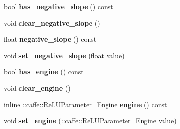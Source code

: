 \begin{DoxyCompactItemize}
\item 
\mbox{\label{classcaffe_1_1_re_l_u_parameter_aab97fa54fb5612aac71e783ff50fb45d}} 
bool {\bfseries has\+\_\+negative\+\_\+slope} () const
\item 
\mbox{\label{classcaffe_1_1_re_l_u_parameter_a61bcb0fe079237105af54eb543a0c786}} 
void {\bfseries clear\+\_\+negative\+\_\+slope} ()
\item 
\mbox{\label{classcaffe_1_1_re_l_u_parameter_a564297ba27a5412fbf069275ff2eec85}} 
float {\bfseries negative\+\_\+slope} () const
\item 
\mbox{\label{classcaffe_1_1_re_l_u_parameter_a45ad9a4d3dbee43fafa3c50b8b48d5bf}} 
void {\bfseries set\+\_\+negative\+\_\+slope} (float value)
\item 
\mbox{\label{classcaffe_1_1_re_l_u_parameter_aad85d4495f66ec22de53568db5a08214}} 
bool {\bfseries has\+\_\+engine} () const
\item 
\mbox{\label{classcaffe_1_1_re_l_u_parameter_a0bc017b4b720aed05f4147f647defeca}} 
void {\bfseries clear\+\_\+engine} ()
\item 
\mbox{\label{classcaffe_1_1_re_l_u_parameter_ae5703e9d10a81df78f81d5c62b0edfb6}} 
inline \+::caffe\+::\+Re\+L\+U\+Parameter\+\_\+\+Engine {\bfseries engine} () const
\item 
\mbox{\label{classcaffe_1_1_re_l_u_parameter_a33f9a29e54ecc782ab172c8eaaccf55d}} 
void {\bfseries set\+\_\+engine} (\+::caffe\+::\+Re\+L\+U\+Parameter\+\_\+\+Engine value)
\end{DoxyCompactItemize}
